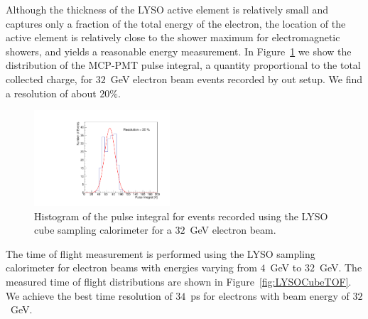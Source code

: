 \documentclass[12pt]{article}
\begin{document}
Although the thickness of the LYSO active element is relatively
small and captures only a fraction of the total energy
of the electron, the location of the active element is relatively close to the
shower maximum for electromagnetic showers, and yields
a reasonable energy measurement. In Figure~\ref{fig:LYSOCubeEnergy32GeV}
we show the distribution of the MCP-PMT pulse integral, a quantity
proportional to the total collected charge, for $32$~GeV electron beam
events recorded by out setup. We find a resolution of about $20\%$.


\begin{figure}[h] \centering
\includegraphics[width=0.45\textwidth]{figs/TOF_Electron_LYSOCube_32GeV_energy} 
\caption{ Histogram of the pulse integral for events recorded using
the LYSO cube sampling calorimeter for a $32$~GeV electron beam. } 
\label{fig:LYSOCubeEnergy32GeV}
\end{figure}

The time of flight measurement is performed using the LYSO sampling calorimeter
for electron beams with energies varying from $4$~GeV to $32$~GeV. The 
measured time of flight distributions are shown in Figure~\ref{fig:LYSOCubeTOF}.
We achieve the best time resolution of $34$~ps for electrons
with beam energy of $32$~GeV.
\end{document}
